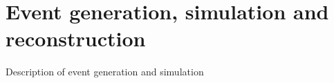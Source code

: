 \chapter{Event generation, simulation and reconstruction}\label{ch:gensimreco}

Description of event generation and simulation